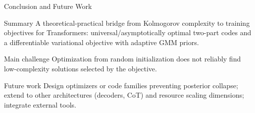 \documentclass{beamer}
\begin{document}
\begin{frame}{Conclusion and Future Work}
\small
\begin{block}{Summary}
A theoretical-practical bridge from Kolmogorov complexity to training objectives for Transformers: universal/asymptotically optimal two-part codes and a differentiable variational objective with adaptive GMM priors.
\end{block}

\begin{block}{Main challenge}
Optimization from random initialization does not reliably find low-complexity solutions selected by the objective.
\end{block}

\begin{block}{Future work}
Design optimizers or code families preventing posterior collapse; extend to other architectures (decoders, CoT) and resource scaling dimensions; integrate external tools.
\end{block}
\end{frame}
\end{document}
